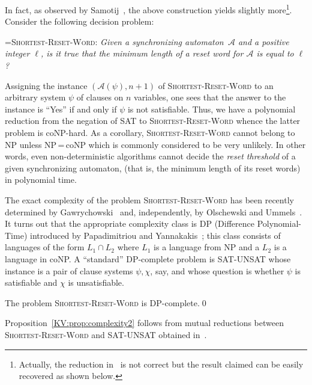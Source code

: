 \documentclass{irmaart}
\newcommand{\san}{synchronizing au\-tom\-a\-ton}
\newcommand{\sws}{reset words}
\newcommand{\rt}{reset threshold}
\theoremstyle{plain}
\begin{document}
In fact, as observed by Samotij~\cite{Samotij:2007}, the above
construction yields slightly more\footnote{Actually, the reduction
in~\cite{Samotij:2007} is not correct but the result claimed can
be easily recovered as shown below.}. Consider the following
decision problem:

\smallskip

\hangindent=\parindent \noindent \textsc{Shortest-Reset-Word:}
\emph{Given a \san\ $\mathcal{A}$ and a positive integer $\ell$,
is it true that the minimum length of a reset word for
$\mathcal{A}$ is equal to $\ell$?}

\smallskip

\noindent Assigning the instance $(\mathcal{A}(\psi),n+1)$ of
\textsc{Shortest-Reset-Word} to an arbitrary system $\psi$ of clauses on $n$
variables, one sees that the answer to the instance is ``Yes'' if and only if
$\psi$ is not satisfiable. Thus, we have a polynomial reduction from the
negation of \textsc{SAT} to \textsc{Shortest-Reset-Word} whence the latter
problem is \textsf{coNP}-hard. As a corollary, \textsc{Shortest-Reset-Word}
cannot belong to \textsf{NP} unless \textsf{NP}\,=\,\textsf{coNP} which is
commonly considered to be very unlikely. In other words, even non-deterministic
algorithms cannot decide the \emph{\rt} of a given \san,
(that is, the minimum length of its \sws) in polynomial time.

The exact complexity of the problem \textsc{Shortest-Reset-Word}
has been recently determined by
Gawrychowski~\cite{Gawrychowski:2008} and, independently, by
Olschewski and Ummels~\cite{Olschewski&Ummels:2010}. It turns out
that the appropriate complexity class is \textsf{DP}
(\textsf{Difference Polynomial-Time}) introduced by Papadimitriou
and Yannakakis~\cite{Papadimitriou&Yannakakis:1984}; this class
consists of languages of the form $L_1\cap L_2$ where $L_1$ is a
language from \textsf{NP} and a $L_2$ is a language in
\textsf{coNP}. A ``standard'' \textsf{DP}-complete problem is
\textsc{SAT-UNSAT} whose instance is a pair of clause systems
$\psi,\chi$, say, and whose question is whether $\psi$ is
satisfiable and $\chi$ is unsatisfiable.

\begin{proposition}
\label{KV:prop:complexity2} The problem \textsc{Shortest-Reset-Word} is
\textsf{DP}-complete.\qed
\end{proposition}

Proposition~\ref{KV:prop:complexity2} follows from mutual
reductions between \textsc{Shortest-Reset-Word} and
\textsc{SAT-UNSAT} obtained
in~\cite{Gawrychowski:2008,Olschewski&Ummels:2010}.
\end{document}
